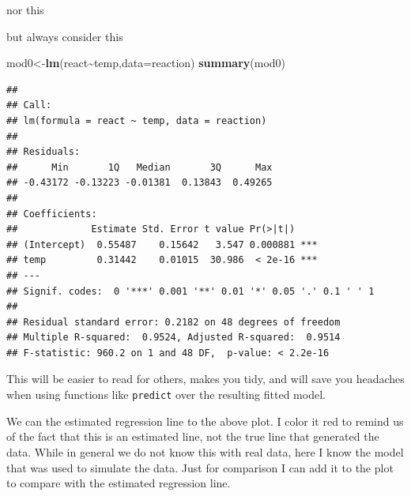 \documentclass[
]{book}
\newenvironment{Shaded}{\begin{snugshade}}{\end{snugshade}}
\newcommand{\AttributeTok}[1]{\textcolor[rgb]{0.13,0.29,0.53}{#1}}
\newcommand{\FunctionTok}[1]{\textcolor[rgb]{0.13,0.29,0.53}{\textbf{#1}}}
\newcommand{\NormalTok}[1]{#1}
\newcommand{\OtherTok}[1]{\textcolor[rgb]{0.56,0.35,0.01}{#1}}
\newcommand{\SpecialCharTok}[1]{\textcolor[rgb]{0.81,0.36,0.00}{\textbf{#1}}}
\begin{document}
nor this

\begin{Shaded}
\end{Shaded}

but always consider this

\begin{Shaded}
\begin{Highlighting}[]
\NormalTok{mod0}\OtherTok{\textless{}{-}}\FunctionTok{lm}\NormalTok{(react}\SpecialCharTok{\textasciitilde{}}\NormalTok{temp,}\AttributeTok{data=}\NormalTok{reaction)}
\FunctionTok{summary}\NormalTok{(mod0)}
\end{Highlighting}
\end{Shaded}

\begin{verbatim}
## 
## Call:
## lm(formula = react ~ temp, data = reaction)
## 
## Residuals:
##      Min       1Q   Median       3Q      Max 
## -0.43172 -0.13223 -0.01381  0.13843  0.49265 
## 
## Coefficients:
##             Estimate Std. Error t value Pr(>|t|)    
## (Intercept)  0.55487    0.15642   3.547 0.000881 ***
## temp         0.31442    0.01015  30.986  < 2e-16 ***
## ---
## Signif. codes:  0 '***' 0.001 '**' 0.01 '*' 0.05 '.' 0.1 ' ' 1
## 
## Residual standard error: 0.2182 on 48 degrees of freedom
## Multiple R-squared:  0.9524, Adjusted R-squared:  0.9514 
## F-statistic: 960.2 on 1 and 48 DF,  p-value: < 2.2e-16
\end{verbatim}

This will be easier to read for others, makes you tidy, and will save you headaches when using functions like \texttt{predict} over the resulting fitted model.

We can the estimated regression line to the above plot. I color it red to remind us of the fact that this is an estimated line, not the true line that generated the data. While in general we do not know this with real data, here I know the model that was used to simulate the data. Just for comparison I can add it to the plot to compare with the estimated regression line.
\end{document}
